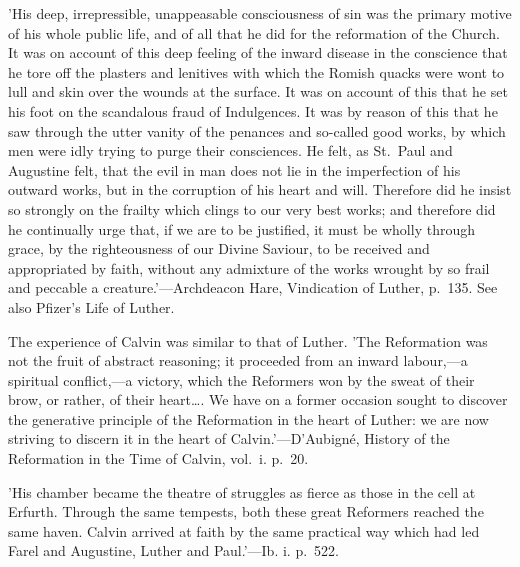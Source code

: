 \documentclass[
]{book}
\begin{document}
{  'His deep, irrepressible, unappeasable consciousness of sin was the primary motive of his whole public life, and of all that he did for the reformation of the Church. It was on account of this deep feeling of the inward disease in the conscience that he tore off the plasters and lenitives with which the Romish quacks were wont to lull and skin over the wounds at the surface. It was on account of this that he set his foot on the scandalous fraud of Indulgences. It was by reason of this that he saw through the utter vanity of the penances and so-called good works, by which men were idly trying to purge their consciences. He felt, as St.~Paul and Augustine felt, that the evil in man does not lie in the imperfection of his outward works, but in the corruption of his heart and will. Therefore did he insist so strongly on the frailty which clings to our very best works; and therefore did he continually urge that, if we are to be justified, it must be wholly through grace, by the righteousness of our Divine Saviour, to be received and appropriated by faith, without any admixture of the works wrought by so frail and peccable a creature.'---Archdeacon Hare, Vindication of Luther, p.~135. See also Pfizer's Life of Luther.

  The experience of Calvin was similar to that of Luther. 'The Reformation was not the fruit of abstract reasoning; it proceeded from an inward labour,---a spiritual conflict,---a victory, which the Reformers won by the sweat of their brow, or rather, of their heart\ldots. We have on a former occasion sought to discover the generative principle of the Reformation in the heart of Luther: we are now striving to discern it in the heart of Calvin.'---D'Aubigné, History of the Reformation in the Time of Calvin, vol.~i. p.~20.

  'His chamber became the theatre of struggles as fierce as those in the cell at Erfurth. Through the same tempests, both these great Reformers reached the same haven. Calvin arrived at faith by the same practical way which had led Farel and Augustine, Luther and Paul.'---Ib. i. p.~522.

}
\end{document}
